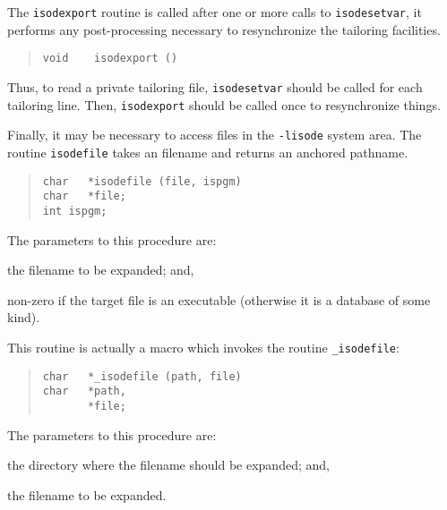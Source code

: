 The \verb"isodexport" routine is called after one or more calls to
\verb"isodesetvar",
it performs any post-processing necessary to resynchronize the tailoring
facilities.
\begin{quote}\small\begin{verbatim}
void    isodexport ()
\end{verbatim}
\end{quote}
Thus,
to read a private tailoring file,
\verb"isodesetvar" should be called for each tailoring line.
Then,
\verb"isodexport" should be called once to resynchronize things.

Finally, it may be necessary to access files in the \verb"-lisode" system area.
The routine \verb"isodefile" takes an filename and returns an anchored
pathname.
\begin{quote}\small\begin{verbatim}
char   *isodefile (file, ispgm)
char   *file;
int	ispgm;
\end{verbatim}\end{quote}
The parameters to this procedure are:
\begin{describe}
\item[\verb"file":] the filename to be expanded;
and,

\item[\verb"ispgm":] non-zero if the target file is an executable
(otherwise it is a database of some kind).
\end{describe}
This routine is actually a macro which invokes the routine \verb"_isodefile":
\begin{quote}\small\begin{verbatim}
char   *_isodefile (path, file)
char   *path,
       *file;
\end{verbatim}\end{quote}
The parameters to this procedure are:
\begin{describe}
\item[\verb"path":] the directory where the filename should be expanded; and,

\item[\verb"file":] the filename to be expanded.
\end{describe}


